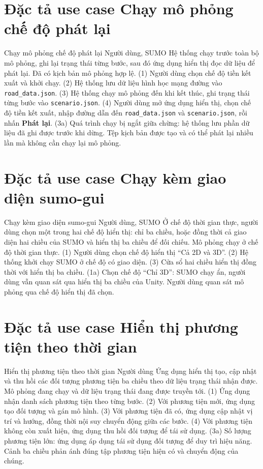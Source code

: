 \documentclass[../DoAn.tex]{subfiles}
\begin{document}
\section{Đặc tả use case Chạy mô phỏng chế độ phát lại}

\uctable
    {Chạy mô phỏng chế độ phát lại}
    {Người dùng, SUMO}
    {Hệ thống chạy trước toàn bộ mô phỏng, ghi lại trạng thái từng bước, sau đó ứng dụng hiển thị đọc dữ liệu để phát lại.}
    {Đã có kịch bản mô phỏng hợp lệ.}
    {(1) Người dùng chọn chế độ tiền kết xuất và khởi chạy. (2) Hệ thống lưu dữ liệu hình học mạng đường vào \texttt{road\_data.json}. (3) Hệ thống chạy mô phỏng đến khi kết thúc, ghi trạng thái từng bước vào \texttt{scenario.json}. (4) Người dùng mở ứng dụng hiển thị, chọn chế độ tiền kết xuất, nhập đường dẫn đến \texttt{road\_data.json} và \texttt{scenario.json}, rồi nhấn \textbf{Phát lại}.}
    {(3a) Quá trình chạy bị ngắt giữa chừng: hệ thống lưu phần dữ liệu đã ghi được trước khi dừng.}
    {Tệp kịch bản được tạo và có thể phát lại nhiều lần mà không cần chạy lại mô phỏng.}

\section{Đặc tả use case Chạy kèm giao diện sumo-gui}

\uctable
    {Chạy kèm giao diện sumo-gui}
    {Người dùng, SUMO}
    {Ở chế độ thời gian thực, người dùng chọn một trong hai chế độ hiển thị: chỉ ba chiều, hoặc đồng thời cả giao diện hai chiều của \gls{SUMO} và hiển thị ba chiều để đối chiếu.}
    {Mô phỏng chạy ở chế độ thời gian thực.}
    {(1) Người dùng chọn chế độ hiển thị ``Cả 2D và 3D''. (2) Hệ thống khởi chạy \gls{SUMO} ở chế độ có giao diện. (3) Cửa sổ hai chiều hiển thị đồng thời với hiển thị ba chiều.}
    {(1a) Chọn chế độ ``Chỉ 3D'': \gls{SUMO} chạy ẩn, người dùng vẫn quan sát qua hiển thị ba chiều của Unity.}
    {Người dùng quan sát mô phỏng qua chế độ hiển thị đã chọn.}

\section{Đặc tả use case Hiển thị phương tiện theo thời gian}

\uctable
    {Hiển thị phương tiện theo thời gian}
    {Người dùng}
    {Ứng dụng hiển thị tạo, cập nhật và thu hồi các đối tượng phương tiện ba chiều theo dữ liệu trạng thái nhận được.}
    {Mô phỏng đang chạy và dữ liệu trạng thái đang được truyền tới.}
    {(1) Ứng dụng nhận danh sách phương tiện theo từng bước. (2) Với phương tiện mới, ứng dụng tạo đối tượng và gán mô hình. (3) Với phương tiện đã có, ứng dụng cập nhật vị trí và hướng, đồng thời nội suy chuyển động giữa các bước. (4) Với phương tiện không còn xuất hiện, ứng dụng thu hồi đối tượng để tái sử dụng.}
    {(3a) Số lượng phương tiện lớn: ứng dụng áp dụng tái sử dụng đối tượng để duy trì hiệu năng.}
    {Cảnh ba chiều phản ánh đúng tập phương tiện hiện có và chuyển động của chúng.}
\end{document}
